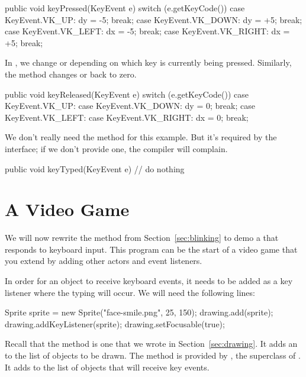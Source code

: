 \begin{code}
public void keyPressed(KeyEvent e) {
    switch (e.getKeyCode()) {
        case KeyEvent.VK_UP:
            dy = -5;
            break;
        case KeyEvent.VK_DOWN:
            dy = +5;
            break;
        case KeyEvent.VK_LEFT:
            dx = -5;
            break;
        case KeyEvent.VK_RIGHT:
            dx = +5;
            break;
    }
}
\end{code}

In , we change  or  depending on which key is currently being pressed.
Similarly, the  method changes  or  back to zero.

\begin{code}
public void keyReleased(KeyEvent e) {
    switch (e.getKeyCode()) {
        case KeyEvent.VK_UP:
        case KeyEvent.VK_DOWN:
            dy = 0;
            break;
        case KeyEvent.VK_LEFT:
        case KeyEvent.VK_RIGHT:
            dx = 0;
            break;
    }
}
\end{code}

We don't really need the  method for this example.
But it's required by the interface; if we don't provide one, the compiler will complain.

\begin{code}
public void keyTyped(KeyEvent e) {
    // do nothing
}
\end{code}


\section{A Video Game}

We will now rewrite the  method from Section~\ref{sec:blinking} to demo a  that responds to keyboard input.
This program can be the start of a video game that you extend by adding other actors and event listeners.

In order for an object to receive keyboard events, it needs to be added as a key listener where the typing will occur.
We will need the following lines:

\begin{code}
Sprite sprite = new Sprite("face-smile.png", 25, 150);
drawing.add(sprite);
drawing.addKeyListener(sprite);
drawing.setFocusable(true);
\end{code}

Recall that the  method is one that we wrote in Section~\ref{sec:drawing}.
It adds an  to the list of objects to be drawn.
The  method is provided by , the superclass of .
It adds  to the list of objects that will receive key events.

